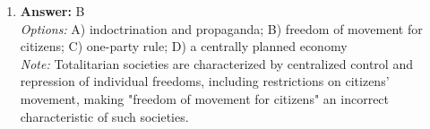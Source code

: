 \documentclass[12pt]{article}
\begin{document}
\begin{enumerate}[label=\arabic*.]
\\ \textit{Note:} This answer illustrates the key concept of differential association theory, which posits that individuals learn behaviors and values through their associations with others, suggesting that peer influence is a significant factor in shaping one's actions and choices.
\item \textbf{Answer:} B
\\ \textit{Options:} A) indoctrination and propaganda; B) freedom of movement for citizens; C) one-party rule; D) a centrally planned economy
\\ \textit{Note:} Totalitarian societies are characterized by centralized control and repression of individual freedoms, including restrictions on citizens' movement, making "freedom of movement for citizens" an incorrect characteristic of such societies.
\end{enumerate}
\end{document}
